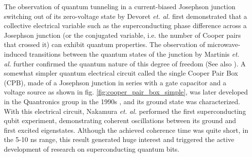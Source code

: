 The observation of quantum tunneling in a current-biased
Josephson junction switching out of its zero-voltage
state by Devoret {\it et. al.} \citep{devoret_measurements_1985,martinis_energy-level_1985}
first demonstrated that a collective electrical variable
such as the superconducting phase difference across a Josephson junction (or the conjugated variable, i.e. the number of Cooper
pairs that crossed it) can exhibit quantum properties. The observation of microwave-induced transitions between the quantum
states of the junction by Martinis {\it et. al.} \citep{martinis_energy-level_1985} further
confirmed the quantum nature of this degree of freedom (See also \cite{martinis_energy-level_1985,martinis_experimental_1987,clarke_quantum_1988}).
A somewhat simpler quantum electrical circuit called the single Cooper
Pair Box (CPB), made of a Josephson junction in series
with a gate capacitor and a voltage source as shown in fig.
\ref{fig:cooper_pair_box_simple}, was later developed in the Quantronics
group in the 1990s \citep{bouchiat_quantum_1998},
and its ground state was characterized. With this electrical
circuit, Nakamura {\it et. al.} \citep{nakamura_coherent_1999} performed the first superconducting
qubit experiment, demonstrating coherent oscillations between its
ground and first excited eigenstates. Although the achieved coherence
time was quite short, in the 5-10 ns range, this result generated huge interest and triggered the active development of research on
superconducting quantum bits.

\smallskip

